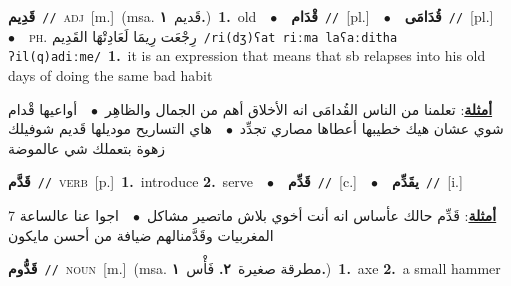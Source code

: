 \documentclass[10pt,a4paper,twoside]{article} %
\begin{document}
\begin{multicols}{2}
{\setlength\topsep{0pt}\textbf{\foreignlanguage{arabic}{قَدِيم}}\ {\color{gray}\texttt{//}\color{black}}\ \textsc{adj}\ [m.]\ \color{gray}(msa. \foreignlanguage{arabic}{قَديم}~\foreignlanguage{arabic}{\textbf{١.}})\color{black}\ \textbf{1.}~old\ \ $\bullet$\ \ \setlength\topsep{0pt}\textbf{\foreignlanguage{arabic}{قْدَام}}\ {\color{gray}\texttt{//}\color{black}}\ [pl.]\ \ $\bullet$\ \ \setlength\topsep{0pt}\textbf{\foreignlanguage{arabic}{قُدَامَى}}\ {\color{gray}\texttt{//}\color{black}}\ [pl.]\ \ $\bullet$\ \ \textsc{ph.} \color{gray} \foreignlanguage{arabic}{رِجْعَت رِيمَا لَعَادِتْهَا القَدِيم}\color{black}\ {\color{gray}\texttt{/{\sffamily ri(dʒ)ʕat riːma laʕaːditha ʔil(q)adiːme}/}\color{black}}\ \textbf{1.}~it is an expression that means that sb relapses into his old days of doing the same bad habit\  \begin{flushright}\color{gray}\foreignlanguage{arabic}{\textbf{\underline{\foreignlanguage{arabic}{أمثلة}}}: تعلمنا من الناس القُدامَى انه الأخلاق أهم من الجمال والظاهِر\ $\bullet$\ \  أواعيها قْدام شوي عشان هيك خطيبها أعطاها مصاري تجدِّد\ $\bullet$\ \  هاي التساريح موديلها قَديم شوفيلك زهوة بتعملك شي عالموضة}\end{flushright}\color{black}} \vspace{2mm}

{\setlength\topsep{0pt}\textbf{\foreignlanguage{arabic}{قَدَّم}}\ {\color{gray}\texttt{//}\color{black}}\ \textsc{verb}\ [p.]\ \textbf{1.}~introduce  \textbf{2.}~serve\ \ $\bullet$\ \ \setlength\topsep{0pt}\textbf{\foreignlanguage{arabic}{قَدِّم}}\ {\color{gray}\texttt{//}\color{black}}\ [c.]\ \ $\bullet$\ \ \setlength\topsep{0pt}\textbf{\foreignlanguage{arabic}{يقَدِّم}}\ {\color{gray}\texttt{//}\color{black}}\ [i.]\  \begin{flushright}\color{gray}\foreignlanguage{arabic}{\textbf{\underline{\foreignlanguage{arabic}{أمثلة}}}: قَدِّم حالك عأساس انه أنت أخوي بلاش ماتصير مشاكل\ $\bullet$\ \  اجوا عنا عالساعة 7 المغربيات وقَدَّمنالهم ضيافة من أحسن مايكون}\end{flushright}\color{black}} \vspace{2mm}

{\setlength\topsep{0pt}\textbf{\foreignlanguage{arabic}{قَدُّوم}}\ {\color{gray}\texttt{//}\color{black}}\ \textsc{noun}\ [m.]\ \color{gray}(msa. \foreignlanguage{arabic}{مطرقة صغيرة}~\foreignlanguage{arabic}{\textbf{٢.}}  \foreignlanguage{arabic}{فَأْس}~\foreignlanguage{arabic}{\textbf{١.}})\color{black}\ \textbf{1.}~axe  \textbf{2.}~a small hammer\ } \vspace{2mm}


\end{multicols}
\end{document}
